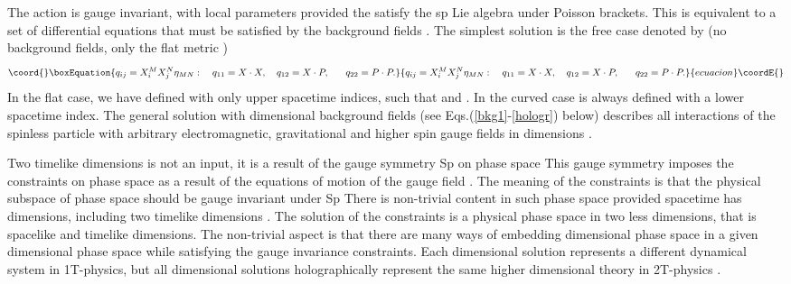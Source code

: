 \documentclass[a4paper,12pt]{article}
\begin{document}
The action \coordHE{} is gauge invariant, with local parameters \coordHE{} provided the \coordHE{} satisfy
the sp\coordHE{} Lie algebra under Poisson brackets. This is
equivalent to a set of differential equations that must be satisfied by the
background fields \coordHE{}
\cite{emgrav}\cite{highspin}. The simplest solution is the free case denoted
by \coordHE{} (no background fields, only the flat metric \coordHE{})
\begin{equation}\coord{}\boxEquation{
q_{ij}=X_{i}^{M}X_{j}^{N}\eta _{MN}:\quad q_{11}=X\cdot X,\quad
q_{12}=X\cdot P,\quad \ \ q_{22}=P\cdot P.  \label{free}
}{
q_{ij}=X_{i}^{M}X_{j}^{N}\eta _{MN}:\quad q_{11}=X\cdot X,\quad
q_{12}=X\cdot P,\quad \ \ q_{22}=P\cdot P.  }{ecuacion}\coordE{}\end{equation}
In the flat case, we have defined \coordHE{} with only upper
spacetime indices, such that \coordHE{} and \coordHE{}. In the
curved case \coordHE{} is always defined with a lower spacetime index.
The general solution with \coordHE{} dimensional background fields (see
Eqs.(\ref{bkg1}-\ref{hologr}) below) describes all interactions
of the spinless particle with arbitrary electromagnetic,
gravitational and higher spin gauge fields in \coordHE{} dimensions
\cite{highspin}.

Two timelike dimensions is not an input, it is a result of the
gauge symmetry Sp\coordHE{} on phase space \coordHE{} This gauge symmetry imposes the constraints \coordHE{} on
phase space as a result of the equations of motion of the gauge
field \coordHE{}. The meaning of the constraints
is that the physical subspace of phase space should be gauge
invariant under Sp\coordHE{} There is non-trivial
content in such phase space provided spacetime has \coordHE{}
dimensions, including two timelike dimensions \cite{old2T}. The
solution of the constraints is a physical phase space in two less
dimensions, that is \coordHE{} spacelike and \coordHE{}
timelike dimensions. The non-trivial aspect is that there are many
ways of embedding \coordHE{} dimensional phase space in a given \coordHE{}
dimensional phase space while satisfying the gauge invariance
constraints. Each \coordHE{} dimensional solution represents a different
dynamical system in 1T-physics, but all \coordHE{} dimensional solutions
holographically represent the same higher dimensional \coordHE{} theory
in 2T-physics \cite{old2T}.
\end{document}
